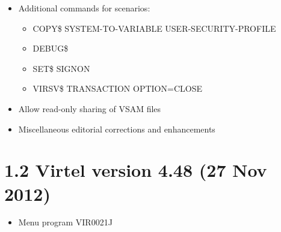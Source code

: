 \documentclass[letterpaper,10pt,english]{sphinxmanual}
\begin{document}
\begin{itemize}
\item {} 
Additional commands for scenarios:
\begin{itemize}
\item {} 
COPY\$ SYSTEM-TO-VARIABLE USER-SECURITY-PROFILE

\item {} 
DEBUG\$

\item {} 
SET\$ SIGNON

\item {} 
VIRSV\$ TRANSACTION OPTION=CLOSE

\end{itemize}

\end{itemize}

\begin{itemize}
\item {} 
Allow read-only sharing of VSAM files

\end{itemize}

\begin{itemize}
\item {} 
Miscellaneous editorial corrections and enhancements

\end{itemize}


\section{1.2 Virtel version 4.48 (27 Nov 2012)}
\label{\detokenize{Installation_Guide:virtel-version-4-48-27-nov-2012}}
\begin{itemize}
\item {} 
Menu program VIR0021J

\end{itemize}
\end{document}
